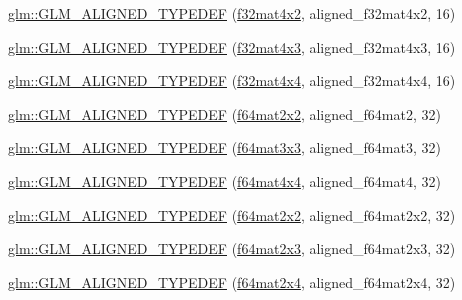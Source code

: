 \begin{DoxyCompactItemize}
\item 
\hyperlink{group__gtx__type__aligned_ga99ce8274c750fbfdf0e70c95946a2875}{glm\+::\+G\+L\+M\+\_\+\+A\+L\+I\+G\+N\+E\+D\+\_\+\+T\+Y\+P\+E\+D\+EF} (\hyperlink{group__gtc__type__precision_gab0498cc84bb77002f41630e3cd0be87b}{f32mat4x2}, aligned\+\_\+f32mat4x2, 16)
\item 
\hyperlink{group__gtx__type__aligned_ga9476ef66790239df53dbe66f3989c3b5}{glm\+::\+G\+L\+M\+\_\+\+A\+L\+I\+G\+N\+E\+D\+\_\+\+T\+Y\+P\+E\+D\+EF} (\hyperlink{group__gtc__type__precision_ga74544c9bd76adba0e7767b6b2a574d0f}{f32mat4x3}, aligned\+\_\+f32mat4x3, 16)
\item 
\hyperlink{group__gtx__type__aligned_gacc429b3b0b49921e12713b6d31e14e1d}{glm\+::\+G\+L\+M\+\_\+\+A\+L\+I\+G\+N\+E\+D\+\_\+\+T\+Y\+P\+E\+D\+EF} (\hyperlink{group__gtc__type__precision_ga2ba95a5c37eef05b26ac10e03daa5c84}{f32mat4x4}, aligned\+\_\+f32mat4x4, 16)
\item 
\hyperlink{group__gtx__type__aligned_ga88f6c6fa06e6e64479763e69444669cf}{glm\+::\+G\+L\+M\+\_\+\+A\+L\+I\+G\+N\+E\+D\+\_\+\+T\+Y\+P\+E\+D\+EF} (\hyperlink{group__gtc__type__precision_gae18de078e2885803ceda215c6e04a08a}{f64mat2x2}, aligned\+\_\+f64mat2, 32)
\item 
\hyperlink{group__gtx__type__aligned_gaae8e4639c991e64754145ab8e4c32083}{glm\+::\+G\+L\+M\+\_\+\+A\+L\+I\+G\+N\+E\+D\+\_\+\+T\+Y\+P\+E\+D\+EF} (\hyperlink{group__gtc__type__precision_ga3b494201796c4200886e59f9695ecff0}{f64mat3x3}, aligned\+\_\+f64mat3, 32)
\item 
\hyperlink{group__gtx__type__aligned_ga6e9094f3feb3b5b49d0f83683a101fde}{glm\+::\+G\+L\+M\+\_\+\+A\+L\+I\+G\+N\+E\+D\+\_\+\+T\+Y\+P\+E\+D\+EF} (\hyperlink{group__gtc__type__precision_ga5fc21633b1546e4599609c47b4c8dac4}{f64mat4x4}, aligned\+\_\+f64mat4, 32)
\item 
\hyperlink{group__gtx__type__aligned_gadbd2c639c03de1c3e9591b5a39f65559}{glm\+::\+G\+L\+M\+\_\+\+A\+L\+I\+G\+N\+E\+D\+\_\+\+T\+Y\+P\+E\+D\+EF} (\hyperlink{group__gtc__type__precision_gae18de078e2885803ceda215c6e04a08a}{f64mat2x2}, aligned\+\_\+f64mat2x2, 32)
\item 
\hyperlink{group__gtx__type__aligned_gab059d7b9fe2094acc563b7223987499f}{glm\+::\+G\+L\+M\+\_\+\+A\+L\+I\+G\+N\+E\+D\+\_\+\+T\+Y\+P\+E\+D\+EF} (\hyperlink{group__gtc__type__precision_ga7816d266eaf216e384c3c6d1e570b9f3}{f64mat2x3}, aligned\+\_\+f64mat2x3, 32)
\item 
\hyperlink{group__gtx__type__aligned_gabbc811d1c52ed2b8cfcaff1378f75c69}{glm\+::\+G\+L\+M\+\_\+\+A\+L\+I\+G\+N\+E\+D\+\_\+\+T\+Y\+P\+E\+D\+EF} (\hyperlink{group__gtc__type__precision_gae075a2083e1801ada5c99c91f79eb6ed}{f64mat2x4}, aligned\+\_\+f64mat2x4, 32)

\end{DoxyCompactItemize}

